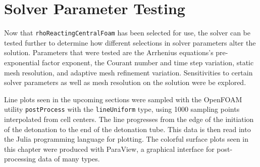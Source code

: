 \chapter{Solver Parameter Testing}
\label{solvtestchap}







Now that \verb|rhoReactingCentralFoam| has been selected for use, the solver can be tested further to determine how different selections in solver parameters alter the solution. Parameters that were tested are the Arrhenius equations's pre-exponential factor exponent, the Courant \cite{courant} number and time step variation, static mesh resolution, and adaptive mesh refinement variation. Sensitivities to certain solver parameters as well as mesh resolution on the solution were be explored. 


Line plots seen in the upcoming sections were sampled with the OpenFOAM utility \verb|postProcess| with the \verb|lineUniform| type, using 1000 sampling points interpolated from cell centers. The line progresses from the edge of the initiation of the detonation to the end of the detonation tube. This data is then read into the Julia programming language for plotting. The colorful surface plots seen in this chapter were produced with ParaView\cite{paraview}, a graphical interface for post-processing data of many types. 


